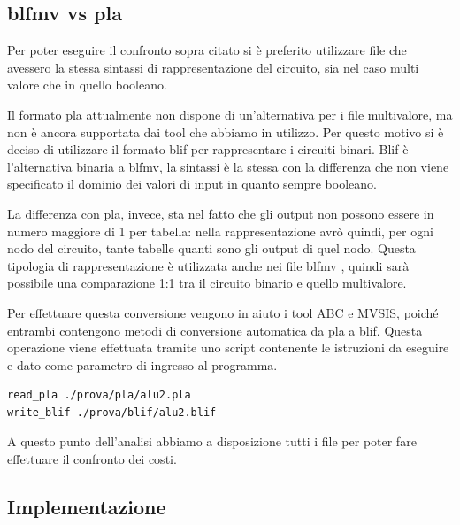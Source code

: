 \documentclass[
  italian,
]{book}
\begin{document}
\newpage

\hypertarget{blfmv-vs-pla}{%
\subsection{blfmv vs pla}\label{blfmv-vs-pla}}

Per poter eseguire il confronto sopra citato si è preferito utilizzare file che avessero la stessa sintassi di rappresentazione del circuito, sia nel caso multi valore che in quello booleano.

Il formato pla attualmente non dispone di un'alternativa per i file multivalore, ma non è ancora supportata dai tool che abbiamo in utilizzo. Per questo motivo si è deciso di utilizzare il formato blif per rappresentare i circuiti binari. Blif è l'alternativa binaria a blfmv, la sintassi è la stessa con la differenza che non viene specificato il dominio dei valori di input in quanto sempre booleano.

La differenza con pla, invece, sta nel fatto che gli output non possono essere in numero maggiore di 1 per tabella: nella rappresentazione avrò quindi, per ogni nodo del circuito, tante tabelle quanti sono gli output di quel nodo. Questa tipologia di rappresentazione è utilizzata anche nei file blfmv , quindi sarà possibile una comparazione 1:1 tra il circuito binario e quello multivalore.

Per effettuare questa conversione vengono in aiuto i tool ABC e MVSIS, poiché entrambi contengono metodi di conversione automatica da pla a blif. Questa operazione viene effettuata tramite uno script contenente le istruzioni da eseguire e dato come parametro di ingresso al programma.

\begin{verbatim}
read_pla ./prova/pla/alu2.pla
write_blif ./prova/blif/alu2.blif
\end{verbatim}

A questo punto dell'analisi abbiamo a disposizione tutti i file per poter fare effettuare il confronto dei costi.

\newpage

\hypertarget{implementazione}{%
\subsection{Implementazione}\label{implementazione}}
\end{document}
